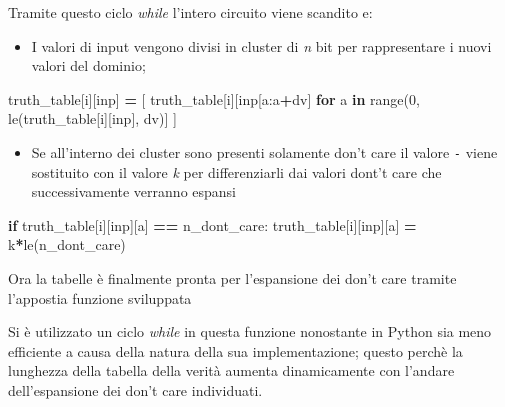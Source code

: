 \documentclass[
  italian,
]{book}
\newenvironment{Shaded}{\begin{snugshade}}{\end{snugshade}}
\newcommand{\BuiltInTok}[1]{#1}
\newcommand{\ControlFlowTok}[1]{\textcolor[rgb]{0.13,0.29,0.53}{\textbf{#1}}}
\newcommand{\DecValTok}[1]{\textcolor[rgb]{0.00,0.00,0.81}{#1}}
\newcommand{\KeywordTok}[1]{\textcolor[rgb]{0.13,0.29,0.53}{\textbf{#1}}}
\newcommand{\NormalTok}[1]{#1}
\newcommand{\OperatorTok}[1]{\textcolor[rgb]{0.81,0.36,0.00}{\textbf{#1}}}
\newcommand{\StringTok}[1]{\textcolor[rgb]{0.31,0.60,0.02}{#1}}
\providecommand{\tightlist}{%
  \setlength{\itemsep}{0pt}\setlength{\parskip}{0pt}}
\begin{document}
\newpage

Tramite questo ciclo \emph{while} l'intero circuito viene scandito e:

\begin{itemize}
\tightlist
\item
  I valori di input vengono divisi in cluster di \emph{n} bit per rappresentare i nuovi valori del dominio;
\end{itemize}

\begin{Shaded}
\begin{Highlighting}[]
\NormalTok{truth\_table[i][}\StringTok{\textquotesingle{}inp\textquotesingle{}}\NormalTok{] }\OperatorTok{=}\NormalTok{ [}
\NormalTok{   truth\_table[i][}\StringTok{\textquotesingle{}inp\textquotesingle{}}\NormalTok{[a:a}\OperatorTok{+}\NormalTok{dv]}
   \ControlFlowTok{for}\NormalTok{ a }\KeywordTok{in} \BuiltInTok{range}\NormalTok{(}\DecValTok{0}\NormalTok{, le(truth\_table[i][}\StringTok{\textquotesingle{}inp\textquotesingle{}}\NormalTok{], dv)]}
\NormalTok{ ]}
\end{Highlighting}
\end{Shaded}

\begin{itemize}
\tightlist
\item
  Se all'interno dei cluster sono presenti solamente don't care il valore \texttt{-} viene sostituito con il valore \emph{k} per differenziarli dai valori dont't care che successivamente verranno espansi
\end{itemize}

\begin{Shaded}
\begin{Highlighting}[]
\ControlFlowTok{if}\NormalTok{ truth\_table[i][}\StringTok{\textquotesingle{}inp\textquotesingle{}}\NormalTok{][a] }\OperatorTok{==}\NormalTok{ n\_dont\_care:}
\NormalTok{  truth\_table[i][}\StringTok{\textquotesingle{}inp\textquotesingle{}}\NormalTok{][a] }\OperatorTok{=} \StringTok{\textquotesingle{}k\textquotesingle{}}\OperatorTok{*}\NormalTok{le(n\_dont\_care)}
\end{Highlighting}
\end{Shaded}

Ora la tabelle è finalmente pronta per l'espansione dei don't care tramite l'appostia funzione sviluppata

Si è utilizzato un ciclo \emph{while} in questa funzione nonostante in Python sia meno efficiente a causa della natura della sua implementazione; questo perchè la lunghezza della tabella della verità aumenta dinamicamente con l'andare dell'espansione dei don't care individuati.
\end{document}
